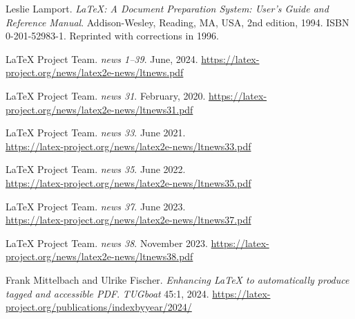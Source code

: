 \documentclass{ltnews}
\providecommand\Dash {\unskip \textemdash}
\providecommand\tubcommand[1]{}
\begin{document}
\tubcommand{\newpage}
\begin{thebibliography}{9}\frenchspacing



Leslie Lamport.
\newblock \emph{{\LaTeX}: {A} Document Preparation System: User's Guide and Reference
  Manual}.
\newblock \mbox{Addison}-Wesley, Reading, MA, USA, 2nd edition, 1994.
\newblock ISBN 0-201-52983-1.
\newblock Reprinted with corrections in 1996.

 \LaTeX{} Project Team.
  \emph{\LaTeXe{} news 1--39}. June, 2024.
  \url{https://latex-project.org/news/latex2e-news/ltnews.pdf}

 \LaTeX{} Project Team.
  \emph{\LaTeXe{} news 31}. February, 2020.
  \url{https://latex-project.org/news/latex2e-news/ltnews31.pdf}

 \LaTeX{} Project Team.
  \emph{\LaTeXe{} news 33}. June 2021.\\
  \url{https://latex-project.org/news/latex2e-news/ltnews33.pdf}

 \LaTeX{} Project Team.
  \emph{\LaTeXe{} news 35}. June 2022.\\
  \url{https://latex-project.org/news/latex2e-news/ltnews35.pdf}

 \LaTeX{} Project Team.
  \emph{\LaTeXe{} news 37}. June 2023.\\
  \url{https://latex-project.org/news/latex2e-news/ltnews37.pdf}

 \LaTeX{} Project Team.
  \emph{\LaTeXe{} news 38}. November 2023.
  \url{https://latex-project.org/news/latex2e-news/ltnews38.pdf}

 Frank Mittelbach and Ulrike Fischer.
  \emph{Enhancing \LaTeX{} to automatically produce
  tagged and accessible PDF}. \textsl{TUGboat} 45:1, 2024.
  \url{https://latex-project.org/publications/indexbyyear/2024/}


\end{thebibliography}
\end{document}
